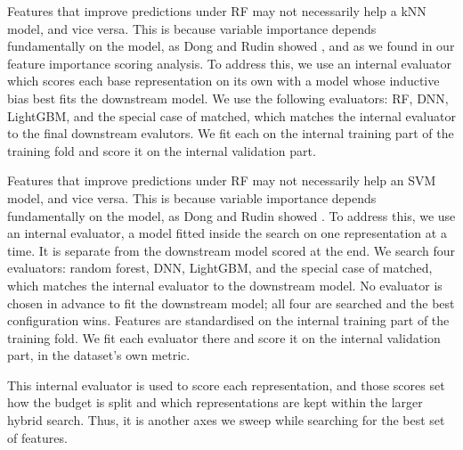 
Features that improve predictions under RF may not necessarily help a kNN model, and vice versa. This is because variable importance depends fundamentally on the model, as Dong and Rudin showed \citep{Dong2020}, and as we found in our feature importance scoring analysis. To address this, we use an internal evaluator which scores each base representation on its own with a model whose inductive bias best fits the downstream model. We use the following evaluators: RF, DNN, LightGBM, and the special case of matched, which matches the internal evaluator to the final downstream evalutors. We fit each on the internal training part of the training fold and score it on the internal validation part.

Features that improve predictions under RF may not necessarily help an SVM model, and vice versa. This is because variable importance depends fundamentally on the model, as Dong and Rudin showed \citep{Dong2020}. To address this, we use an internal evaluator, a model fitted inside the search on one representation at a time. It is separate from the downstream model scored at the end. We search four evaluators: random forest, DNN, LightGBM, and the special case of matched, which matches the internal evaluator to the downstream model. No evaluator is chosen in advance to fit the downstream model; all four are searched and the best configuration wins. Features are standardised on the internal training part of the training fold. We fit each evaluator there and score it on the internal validation part, in the dataset's own metric.

This internal evaluator is used to score each representation, and those scores set how the budget is split and which representations are kept within the larger hybrid search. Thus, it is another axes we sweep while searching for the best set of features.

